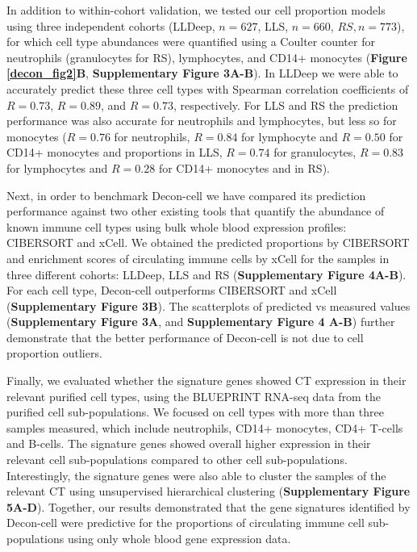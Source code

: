 In addition to within-cohort validation, we tested our cell proportion models using three independent cohorts (LLDeep, $n = 627$, LLS, $n = 660$, $RS, n = 773$), for which cell type abundances were quantified using a Coulter counter for neutrophils (granulocytes for RS), lymphocytes, and CD14+ monocytes (\textbf{Figure \ref{decon_fig2}B}, \textbf{Supplementary Figure 3A-B}). In LLDeep we were able to accurately predict these three cell types with Spearman correlation coefficients of $R = 0.73$, $R = 0.89$, and $R = 0.73$, respectively.  For LLS and RS the prediction performance was also accurate for neutrophils and lymphocytes, but less so for monocytes ($R= 0.76$ for neutrophils, $R = 0.84$ for lymphocyte and $R = 0.50$ for CD14+ monocytes and proportions in LLS, $R = 0.74$ for granulocytes, $R = 0.83$ for lymphocytes and $R = 0.28$ for CD14+ monocytes and in RS). 

Next, in order to benchmark Decon-cell we have compared its prediction performance against two other existing tools that quantify the abundance of known immune cell types using bulk whole blood expression profiles: CIBERSORT\cite{newmanRobustEnumerationCell2015} and xCell\cite{aranXCellDigitallyPortraying2017}. We obtained the predicted proportions by CIBERSORT and enrichment scores of circulating immune cells by xCell for the samples in three different cohorts: LLDeep, LLS and RS (\textbf{Supplementary Figure 4A-B}). For each cell type, Decon-cell outperforms CIBERSORT and xCell (\textbf{Supplementary Figure 3B}). The scatterplots of predicted vs measured values  (\textbf{Supplementary Figure 3A}, and \textbf{Supplementary Figure 4 A-B}) further demonstrate that the better performance of Decon-cell is not due to cell proportion outliers.

Finally, we evaluated whether the signature genes showed CT expression in their relevant purified cell types, using the BLUEPRINT\cite{adamsBLUEPRINTDecodeEpigenetic2012} RNA-seq data from the purified cell sub-populations. We focused on cell types with more than three samples measured, which include neutrophils, CD14+ monocytes, CD4+ T-cells and B-cells. The signature genes showed overall higher expression in their relevant cell sub-populations compared to other cell sub-populations. Interestingly, the signature genes were also able to cluster the samples of the relevant CT using unsupervised hierarchical clustering (\textbf{Supplementary Figure 5A-D}). Together, our results demonstrated that the gene signatures identified by Decon-cell were predictive for the proportions of circulating immune cell sub-populations using only whole blood gene expression data.


